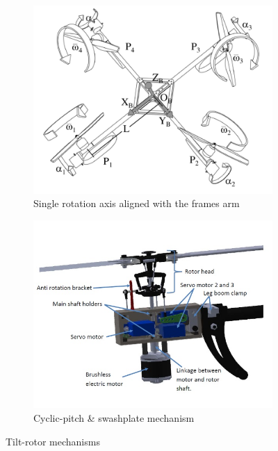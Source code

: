 \begin{figure}[htbp]
\centering
\begin{subfigure}{.5\textwidth}
\includegraphics[width=\textwidth]{figs/tiltpropellercontrol1}
\caption{Single rotation axis aligned with the frames arm}
\label{fig:tiltpropellercontrol1}
\end{subfigure}%
\begin{subfigure}{.5\textwidth}
\includegraphics[width=\textwidth]{figs/napsholm-mech}
\caption{Cyclic-pitch \& swashplate mechanism}
\label{fig:tiltrotor-napsholm}
\end{subfigure}
\caption{Tilt-rotor mechanisms}
\label{fig:tiltprop}
\end{figure}
